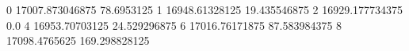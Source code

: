 0 17007.873046875 78.6953125
1 16948.61328125 19.435546875
2 16929.177734375 0.0
4 16953.70703125 24.529296875
6 17016.76171875 87.583984375
8 17098.4765625 169.298828125
